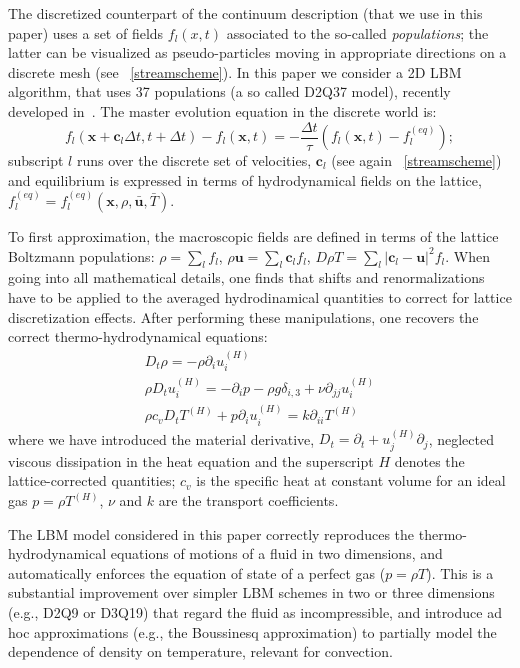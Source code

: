 \documentclass{elsarticle}
\newcommand{\T}{T}
\newcommand{\dt}{{\Delta t}}
\newcommand{\pii}{{\partial_i}}
\newcommand{\pj}{{\partial_j}}
\begin{document}
The discretized counterpart of the continuum description (that we use in
this paper) uses a set of fields $f_l(x,t)$ associated to the so-called {\em
populations}; the latter can be visualized as pseudo-particles moving in
appropriate directions on a discrete mesh (see \figurename~\ref{streamscheme}). 
In this paper we consider a 2D LBM algorithm, that uses 37 populations
(a so called D2Q37 model), recently developed in~\cite{JFM,POF}.
The master evolution equation in the discrete world is:
\begin{equation}
f_{l}({\bm x}+ {\bm c}_{l} \dt,t+\dt) - f_{l}({\bm x},t) =
-\frac{\dt}{\tau}\left(f_{l}({\bm x},t) - f_l^{(eq)}\right);
\label{eq:discrete}
\end{equation}
subscript $l$ runs over the discrete set of velocities, ${\bm c}_l$
(see again \figurename~\ref{streamscheme}) and
equilibrium is expressed in terms of hydrodynamical fields on the
lattice, $ {f}_{l}^{(eq)} = {f}_{l}^{(eq)}({\bm x},\rho,\bar{\bm u},\bar\T)$.
 
To first approximation, the macroscopic fields are defined in terms of the
lattice Boltzmann populations: $\rho = \sum_l f_l$, $\rho {\bm u} = \sum_l {\bm
c}_l f_l$, $D \rho \T = \sum_l \left|{\bm c}_l - {\bm u}\right|^2 f_l$.
When going into all mathematical details, one finds that shifts and
renormalizations have to be applied to the averaged hydrodinamical quantities
to correct for lattice discretization effects. After performing these
manipulations, one recovers  the correct
thermo-hydrodynamical equations:
\begin{eqnarray}
D_t \rho = - \rho \pii u^{(H)}_i \\
\rho D_t u^{(H)}_i = - \pii p - \rho g\delta_{i,3} + \nu \partial_{jj} 
u^{(H)}_i  \\
\rho c_v D_t T^{(H)} + p \pii u^{(H)}_i = k \partial_{ii} T^{(H)} 
\end{eqnarray}
where we have introduced the material derivative, $D_t = \partial_t +
u_j^{(H)} \pj$, neglected viscous dissipation in the heat
equation and the superscript $H$ denotes the lattice-corrected
quantities; $c_v$ is the specific heat at
constant volume  for an ideal gas $p=\rho T^{(H)}$,
$\nu$ and $k$ are the transport coefficients.


The LBM model considered in this paper correctly
reproduces the thermo-hydrodynamical equations  of motions of a fluid in two
dimensions, and automatically enforces the  equation of state of a perfect gas
($p = \rho T$).
%
This is a substantial improvement over simpler LBM schemes in two or three
dimensions (e.g., D2Q9 or D3Q19) that regard the fluid as
incompressible, and introduce ad hoc approximations (e.g., the
Boussinesq approximation) to partially model the dependence of density on
temperature, relevant for convection. 
\end{document}
